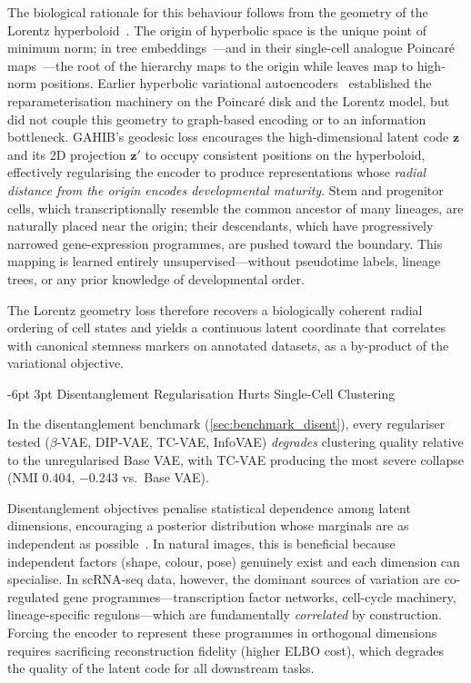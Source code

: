 \documentclass[preprint,12pt]{elsarticle}
\makeatletter
\renewcommand\subsection{\@startsection{subsection}{2}{\z@}%
  {-6pt \@plus -2pt \@minus -2pt}%
  {3pt \@plus 1pt \@minus 1pt}%
  {\normalfont\large\bfseries}}
\newcommand{\bz}{\mathbf{z}}
\makeatother
\begin{document}
The biological rationale for this behaviour follows from the geometry of
the Lorentz hyperboloid~\cite{ganea2018hyperbolic}.
The origin of hyperbolic space is the unique point of minimum norm; in
tree embeddings~\cite{nickel2017poincare}---and in their single-cell
analogue Poincar\'e maps~\cite{klimovskaia2020poincare}---the root of
the hierarchy maps to the origin while leaves map to high-norm positions.
Earlier hyperbolic variational
autoencoders~\cite{mathieu2019poincarevae,nagano2019wrappednormal}
established the reparameterisation machinery on the Poincar\'e disk and
the Lorentz model, but did not couple this geometry to graph-based
encoding or to an information bottleneck.
GAHIB's geodesic loss encourages the high-dimensional latent code $\bz$
and its 2D projection $\bz'$ to occupy consistent positions on the
hyperboloid, effectively regularising the encoder to produce representations
whose \emph{radial distance from the origin encodes developmental
maturity}.
Stem and progenitor cells, which transcriptionally resemble the common
ancestor of many lineages, are naturally placed near the origin; their
descendants, which have progressively narrowed gene-expression programmes,
are pushed toward the boundary.
This mapping is learned entirely unsupervised---without pseudotime labels,
lineage trees, or any prior knowledge of developmental order.

The Lorentz geometry loss therefore recovers a biologically
coherent radial ordering of cell states and yields a continuous
latent coordinate that correlates with canonical stemness markers on
annotated datasets, as a by-product of the variational objective.

\subsection{Disentanglement Regularisation Hurts Single-Cell Clustering}

In the disentanglement benchmark (\cref{sec:benchmark_disent}), every
regulariser tested (\(\beta\)-VAE, DIP-VAE, TC-VAE, InfoVAE)
\emph{degrades} clustering quality relative to the unregularised
Base VAE, with TC-VAE producing the most severe collapse
(NMI 0.404, $-$0.243 vs.\ Base VAE).

Disentanglement objectives penalise statistical dependence among latent
dimensions, encouraging a posterior distribution whose marginals are as
independent as possible~\cite{higgins2017betavae,chen2018isolating}.
In natural images, this is beneficial because independent factors (shape,
colour, pose) genuinely exist and each dimension can specialise.
In scRNA-seq data, however, the dominant sources of variation are
co-regulated gene programmes---transcription factor networks, cell-cycle
machinery, lineage-specific regulons---which are fundamentally
\emph{correlated} by construction.
Forcing the encoder to represent these programmes in orthogonal dimensions
requires sacrificing reconstruction fidelity (higher ELBO cost), which
degrades the quality of the latent code for all downstream tasks.
\end{document}
